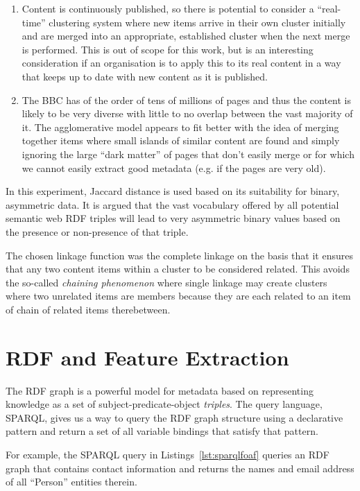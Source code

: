 \begin{enumerate}
\item Content is continuously published, so there is potential
  to consider a ``real-time'' clustering system where new items
  arrive in their own cluster initially and are merged into an
  appropriate, established cluster when the next merge is performed.
  This is out of scope for this work, but is an interesting
  consideration if an organisation is to apply this to its real
  content in a way that keeps up to date with new content as it is
  published.
\item The BBC has of the order of tens of millions of pages and thus
  the content is likely to be very diverse with little to no overlap
  between the vast majority of it. The agglomerative model appears to
  fit better with the idea of merging together items where small
  islands of similar content are found and simply ignoring the large
  ``dark matter'' of pages that don't easily merge or for which we
  cannot easily extract good metadata (e.g. if the pages are very
  old).
\end{enumerate}

In this experiment, Jaccard distance\cite{witten2005data} is used
based on its suitability for binary, asymmetric data.\cite{choi2010survey}
It is argued
that the vast vocabulary offered by all potential semantic web
RDF triples will lead to very asymmetric binary values based on the
presence or non-presence of that triple.

The chosen linkage function was the complete linkage
on the basis that it ensures that any two content items
within a cluster to be considered related. This avoids the so-called
\emph{chaining phenomenon} where single linkage may create clusters
where two unrelated items are members because they are each related
to an item of chain of related items
therebetween.\cite{everitt2011hierarchical}

\section{RDF and Feature Extraction}
\label{sec:rdf-and-features}

The RDF graph is a powerful model
for metadata based on representing knowledge as a set of
subject-predicate-object \emph{triples}. The query language, SPARQL, gives us a
way to query the RDF graph structure using a declarative pattern and return a
set of all variable bindings that satisfy that pattern.

For example, the SPARQL query in Listings~\ref{lst:sparqlfoaf}
queries an RDF graph that contains contact information and returns the
names and email address of all ``Person'' entities therein.

